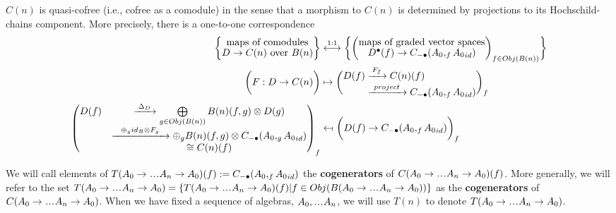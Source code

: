 $C(n)$ is quasi-cofree 
(i.e., cofree as a comodule) in the sense that 
a morphism to $C(n)$ is determined by projections
to its Hochschild-chains component.
More precisely, there is a one-to-one correspondence
\begin{equation}\label{eq:quasicofree}
\begin{split}
\bigg\{ \let\scriptstyle\textstyle
\substack{\textrm{maps of comodules}\\
  D \to C(n)\textrm{ over } B(n)}
\bigg\}
&\overset{1:1}\longleftrightarrow
\bigg\{ \bigg( \let\scriptstyle\textstyle
\substack{\textrm{maps of graded vector spaces}\\
  D^\bullet(f) \to C_{-\bullet}(A_0, _f{A_0}_{id})}
\bigg)_{f \in Obj(B(n))} \bigg\}\\
\bigg( F:D\to C(n) \bigg)
&\mapsto
\bigg( \substack{\begin{split}
  D(f) 
  &\xrightarrow{F_f} C(n)(f) \\
  &\xrightarrow{project}
  C_{-\bullet}(A_0, _f{A_0}_{id})
  \end{split}} 
  \bigg)_f\\
\begin{pmatrix}
  D(f)
  &\xrightarrow{\Delta_D}
  \bigoplus \limits_{g \in Obj(B(n))}
  B(n)(f,g) \otimes D(g)\\
  &\xrightarrow{\oplus_g id_B \otimes F_g}
  \oplus_g
  B(n)(f,g) \otimes C_{-\bullet}(A_0, _g{A_0}_{id})\\
  &\cong C(n)(f)
  \end{pmatrix} _f
&\leftmapsto  
\bigg( D(f) \to
  C_{-\bullet}(A_0, _f{A_0}_{id})
  \bigg)_f\\
\end{split}
\end{equation}
%
\begin{defn}\label{def:cogenerators}
We will call elements of 
$T(A_0 \to \smdots A_n \to A_0)(f) :=
C_{-\bullet}(A_0, _f{A_0}_{id})$ 
the \textbf{cogenerators} of 
$C(A_0 \to \smdots A_n \to A_0)(f)$. 
More generally, we will refer to 
the set $T(A_0 \to \smdots A_n \to A_0) 
= \{T(A_0 \to \smdots A_n \to A_0)(f) | 
f \in Obj(B(A_0 \to \smdots A_n \to A_0))\}$ 
as the \textbf{cogenerators} of 
$C(A_0 \to \smdots A_n \to A_0)$. When we 
have fixed a sequence of algebras, 
$A_0, \smdots A_n$, we will 
use $T(n)$ to denote 
$T(A_0 \to \smdots A_n \to A_0)$.
\end{defn}
%

%
